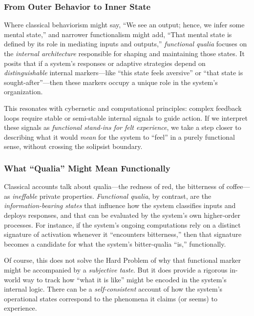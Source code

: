 \documentclass[12pt,letterpaper]{article}
\begin{document}
\subsubsection{From Outer Behavior to Inner State}

Where classical behaviorism might say, ``We see an output; hence, we infer some mental state,'' and narrower functionalism might add, ``That mental state is defined by its role in mediating inputs and outputs,'' \textit{functional qualia} focuses on the \textit{internal architecture} responsible for shaping and maintaining those states. It posits that if a system's responses or adaptive strategies depend on \textit{distinguishable} internal markers---like ``this state feels aversive'' or ``that state is sought-after''---then these markers occupy a unique role in the system's organization.

This resonates with cybernetic and computational principles: complex feedback loops require stable or semi-stable internal signals to guide action. If we interpret these signals as \textit{functional stand-ins for felt experience}, we take a step closer to describing what it would \textit{mean} for the system to ``feel'' in a purely functional sense, without crossing the solipsist boundary.

\subsubsection{What ``Qualia'' Might Mean Functionally}

Classical accounts talk about qualia---the redness of red, the bitterness of coffee---as \textit{ineffable} private properties. \textit{Functional qualia}, by contrast, are the \textit{information-bearing states} that influence how the system classifies inputs and deploys responses, and that can be evaluated by the system's own higher-order processes. For instance, if the system's ongoing computations rely on a distinct signature of activation whenever it ``encounters bitterness,'' then that signature becomes a candidate for what the system's bitter-qualia ``is,'' functionally.

Of course, this does not solve the Hard Problem of why that functional marker might be accompanied by a \textit{subjective taste}. But it does provide a rigorous in-world way to track how ``what it is like'' might be encoded in the system's internal logic. There can be a \textit{self-consistent} account of how the system's operational states correspond to the phenomena it claims (or seems) to experience.
\end{document}
